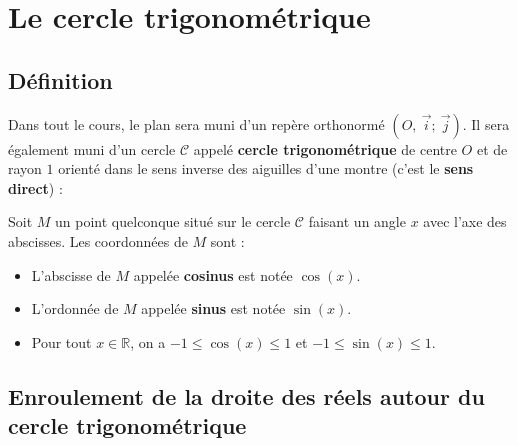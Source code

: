 






	\section{Le cercle trigonométrique}

	\subsection{Définition}

	Dans tout le cours, le plan sera muni d'un repère orthonormé $(O,\ \overrightarrow{i} ;\ \overrightarrow{j})$. Il sera également muni d'un cercle $\mathcal{C}$ appelé \textbf{cercle trigonométrique} de centre $O$ et de rayon $1$ orienté dans le sens inverse des aiguilles d'une montre (c'est le \textbf{sens direct}) :


	\begin{formula}
		Soit $M$ un point quelconque situé sur le cercle $\mathcal{C}$ faisant un angle $x$ avec l'axe des abscisses. Les coordonnées de $M$ sont :
		\begin{itemize}
			\item L'abscisse de $M$ appelée \textbf{cosinus} est notée $\cos(x)$.
			\item L'ordonnée de $M$ appelée \textbf{sinus} est notée $\sin(x)$.
			\item Pour tout $x \in \mathbb{R}$, on a $-1 \leq \cos(x) \leq 1$ et $-1 \leq \sin(x) \leq 1$.
		\end{itemize}
	\end{formula}

	\subsection{Enroulement de la droite des réels autour du cercle trigonométrique}

